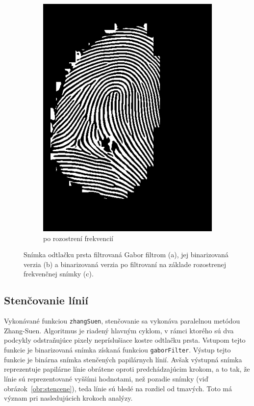 \begin{figure}[h]
\begin{subfigure}[b]{0.3\linewidth}
      \includegraphics[width=\linewidth]{obrazky-figures/gabor_filtered_binarized_freq_blur.png}
      \caption{po rozostrení frekvencií}
      \label{obr:gabor_binar_freq_blur}
    \end{subfigure}
    \caption{Snímka odtlačku prsta filtrovaná Gabor filtrom (a), jej binarizovaná verzia (b) a binarizovaná verzia po filtrovaní na základe rozostrenej
            frekvenčnej snímky (c).}
    \label{obr:gabor}
  \end{figure}

  \subsection{Stenčovanie línií}
  Vykonávané funkciou \texttt{zhangSuen}, stenčovanie sa vykonáva paralelnou metódou Zhang-Suen. Algoritmus je riadený hlavným cyklom, v rámci ktorého sú
  dva podcykly odstraňujúce pixely nepríslušiace kostre odtlačku prsta. Vstupom tejto funkcie je binarizovaná snímka získaná funkciou \texttt{gaborFilter}.
  Výstup tejto funkcie je binárna snímka stenčených papilárnych línií. Avšak výstupná snímka reprezentuje papilárne línie obrátene oproti predchádzajúcim
  krokom, a to tak, že línie sú reprezentované vyššími hodnotami, než pozadie snímky (viď obrázok~{\ref{obr:stencene}}), teda línie sú bledé na rozdiel od
  tmavých. Toto má význam pri nasledujúcich krokoch analýzy.

